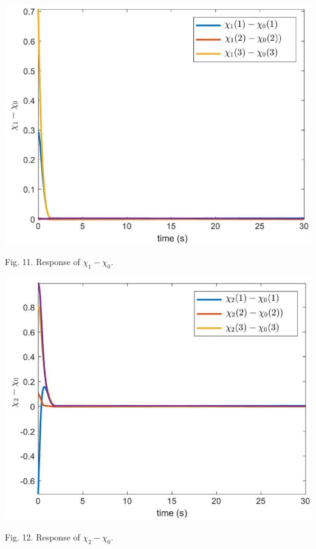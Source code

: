 \documentclass[10pt]{article}
\begin{document}
\begin{center}
\includegraphics[max width=\textwidth]{2023_10_07_a50fd94fd281fe9896c1g-09(1)}
\end{center}

Fig. 11. Response of $\chi_{1}-\chi_{0}$.

\begin{center}
\includegraphics[max width=\textwidth]{2023_10_07_a50fd94fd281fe9896c1g-09(4)}
\end{center}

Fig. 12. Response of $\chi_{2}-\chi_{0}$.
\end{document}
